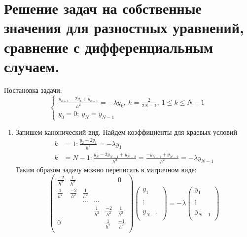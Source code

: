 \section{Решение задач на собственные значения для разностных уравнений, сравнение с дифференциальным случаем.}

Постановка задачи:
\[\begin{cases}
    \frac{y_{k+1}-2y_k+y_{k-1}}{h^2} = -\lambda y_k,\ h = \frac{2}{2N-1},\ 1 \leq k \leq N-1 \\
    y_0 = 0;\ y_N = y_{N-1}
  \end{cases}\]
\begin{enumerate}
  \item Запишем канонический вид. Найдем коэффициенты для краевых условий
        \begin{align*}
          k & = 1: \frac{y_2 - 2y_1}{h^2} = -\lambda y_1                                                    \\
          k & = N-1: \frac{y_N - 2y_{N-1}+y_{N-2}}{h^2} = \frac{-y_{N-1} + y_{N-2}}{h^2} = -\lambda y_{N-1}
        \end{align*}
        Таким образом задачу можно переписать в матричном виде:
        \[\left(\begin{array}{cccccc}
              \frac{-2}{h^2} & \frac{1}{h^2}  &               &               &                & 0              \\
              \frac{1}{h^2}  & \frac{-2}{h^2} & \frac{1}{h^2} &               &                &                \\
                             &                & \cdots        & \cdots        &                &                \\
                             &                &               & \frac{1}{h^2} & \frac{-2}{h^2} & \frac{1}{h^2}  \\
              0              &                &               &               & \frac{1}{h^2}  & \frac{-1}{h^2} \\
            \end{array}\right)
          \left(\begin{array}{c}
              y_{1}   \\
              \\
              \vdots  \\
              \\
              y_{N-1} \\
            \end{array}\right)
          =
          -\lambda
          \left(\begin{array}{c}
              y_{1}   \\
              \\
              \vdots  \\
              \\
              y_{N-1} \\
            \end{array}\right)
        \]


\end{enumerate}
